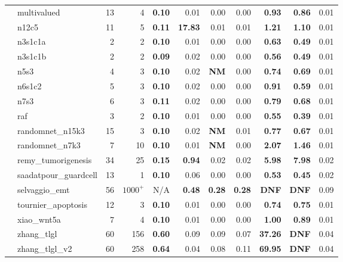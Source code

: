 \documentclass[preprint,12pt]{elsarticle}
\newcounter{rownumber}
\newcommand\rownb{\stepcounter{rownumber}\arabic{rownumber}}
\begin{document}
\begin{table}[!htb]
{\begin{tabular}{rlrrrrrrrrr}
    \rownb & multivalued & 13 & 4 & \textbf{0.10} & 0.01 & 0.00 & 0.00 & \textbf{0.93} & \textbf{0.86} & 0.01\\
    \rownb & n12c5 & 11 & 5 & \textbf{0.11} & \textbf{17.83} & 0.01 & 0.01 & \textbf{1.21} & \textbf{1.10} & 0.01\\
    \rownb & n3s1c1a & 2 & 2 & \textbf{0.10} & 0.01 & 0.00 & 0.00 & \textbf{0.63} & \textbf{0.49} & 0.01\\
    \rownb & n3s1c1b & 2 & 2 & \textbf{0.09} & 0.02 & 0.00 & 0.00 & \textbf{0.56} & \textbf{0.49} & 0.01\\
    \rownb & n5s3 & 4 & 3 & \textbf{0.10} & 0.02 & \textbf{NM} & 0.00 & \textbf{0.74} & \textbf{0.69} & 0.01\\
    \rownb & n6s1c2 & 5 & 3 & \textbf{0.10} & 0.02 & 0.00 & 0.00 & \textbf{0.91} & \textbf{0.59} & 0.01\\
    \rownb & n7s3 & 6 & 3 & \textbf{0.11} & 0.02 & 0.00 & 0.00 & \textbf{0.79} & \textbf{0.68} & 0.01\\
    \rownb & raf & 3 & 2 & \textbf{0.10} & 0.01 & 0.00 & 0.00 & \textbf{0.55} & \textbf{0.39} & 0.01\\
    \rownb & randomnet\_n15k3 & 15 & 3 & \textbf{0.10} & 0.02 & \textbf{NM} & 0.01 & \textbf{0.77} & \textbf{0.67} & 0.01\\
    \rownb & randomnet\_n7k3 & 7 & 10 & \textbf{0.10} & 0.01 & \textbf{NM} & 0.00 & \textbf{2.07} & \textbf{1.46} & 0.01\\
    \rownb & remy\_tumorigenesis & 34 & 25 & \textbf{0.15} & \textbf{0.94} & 0.02 & 0.02 & \textbf{5.98} & \textbf{7.98} & 0.02\\
    \rownb & saadatpour\_guardcell & 13 & 1 & \textbf{0.10} & 0.06 & 0.00 & 0.00 & \textbf{0.53} & \textbf{0.45} & 0.02\\
    \rownb & selvaggio\_emt & 56 & $1000^+$ & N/A & \textbf{0.48} & \textbf{0.28} & \textbf{0.28} & \textbf{DNF} & \textbf{DNF} & 0.09\\
    \rownb & tournier\_apoptosis & 12 & 3 & \textbf{0.10} & 0.01 & 0.00 & 0.00 & \textbf{0.74} & \textbf{0.75} & 0.01\\
    \rownb & xiao\_wnt5a & 7 & 4 & \textbf{0.10} & 0.01 & 0.00 & 0.00 & \textbf{1.00} & \textbf{0.89} & 0.01\\
    \rownb & zhang\_tlgl & 60 & 156 & \textbf{0.60} & 0.09 & 0.09 & 0.07 & \textbf{37.26} & \textbf{DNF} & 0.04\\
    \rownb & zhang\_tlgl\_v2 & 60 & 258 & \textbf{0.64} & 0.04 & 0.08 & 0.11 & \textbf{69.95} & \textbf{DNF} & 0.04\\
    \bottomrule
  \end{tabular}
  }
\end{table}
\setcounter{rownumber}{0}
\end{document}
